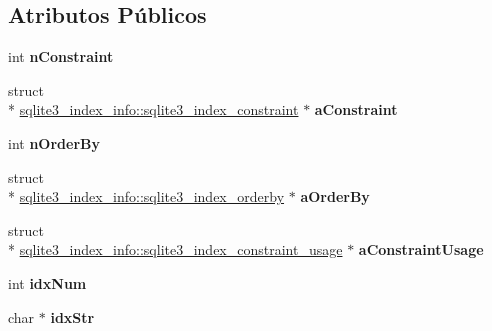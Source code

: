 \subsection*{Atributos Públicos}
\begin{DoxyCompactItemize}
\item 
\hypertarget{structsqlite3__index__info_ae861993a30ce914a5214eab2579d935a}{int {\bfseries n\-Constraint}}\label{structsqlite3__index__info_ae861993a30ce914a5214eab2579d935a}

\item 
\hypertarget{structsqlite3__index__info_a634aa93834e2b47acf34454746c0f248}{struct \\*
\hyperlink{structsqlite3__index__info_1_1sqlite3__index__constraint}{sqlite3\-\_\-index\-\_\-info\-::sqlite3\-\_\-index\-\_\-constraint} $\ast$ {\bfseries a\-Constraint}}\label{structsqlite3__index__info_a634aa93834e2b47acf34454746c0f248}

\item 
\hypertarget{structsqlite3__index__info_a3ef850fdc57eddbc8189fe84d0a9044e}{int {\bfseries n\-Order\-By}}\label{structsqlite3__index__info_a3ef850fdc57eddbc8189fe84d0a9044e}

\item 
\hypertarget{structsqlite3__index__info_a6823a68979e19d8e332389361e920ef9}{struct \\*
\hyperlink{structsqlite3__index__info_1_1sqlite3__index__orderby}{sqlite3\-\_\-index\-\_\-info\-::sqlite3\-\_\-index\-\_\-orderby} $\ast$ {\bfseries a\-Order\-By}}\label{structsqlite3__index__info_a6823a68979e19d8e332389361e920ef9}

\item 
\hypertarget{structsqlite3__index__info_a79b8a969dd7d582fc2ea3c0fbc5adb56}{struct \\*
\hyperlink{structsqlite3__index__info_1_1sqlite3__index__constraint__usage}{sqlite3\-\_\-index\-\_\-info\-::sqlite3\-\_\-index\-\_\-constraint\-\_\-usage} $\ast$ {\bfseries a\-Constraint\-Usage}}\label{structsqlite3__index__info_a79b8a969dd7d582fc2ea3c0fbc5adb56}

\item 
\hypertarget{structsqlite3__index__info_afcee17707a1c147fbd55c23c807fdae3}{int {\bfseries idx\-Num}}\label{structsqlite3__index__info_afcee17707a1c147fbd55c23c807fdae3}

\item 
\hypertarget{structsqlite3__index__info_ac63f4ebfe8d9331b040fa9e0e47c9d70}{char $\ast$ {\bfseries idx\-Str}}\label{structsqlite3__index__info_ac63f4ebfe8d9331b040fa9e0e47c9d70}


\end{DoxyCompactItemize}
